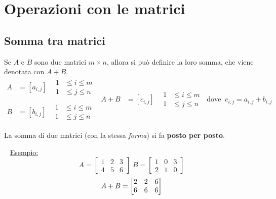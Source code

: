\documentclass[12pt,oneside]{book}
\begin{document}
\section{Operazioni con le matrici}
\subsection{Somma tra matrici}
Se $A$ e $B$ sono due matrici $m \times n$, allora si può definire la loro somma, che viene
denotata con $A+B$.
\begin{equation*}
    \begin{split}
        A & = [a_{i,j}] \;\;\; \begin{aligned} 1&\le i\le m\\ 1&\le j\le n \end{aligned} \\
        \\
        B & = [b_{i,j}] \;\;\; \begin{aligned} 1&\le i\le m\\ 1&\le j\le n \end{aligned}
    \end{split}
    \begin{split}
        A+B & = [c_{i,j}] \;\;\; \begin{aligned} 1&\le i\le m\\ 1&\le j\le n \end{aligned} \;\; \text{dove} \;\;
        c_{i,j} = a_{i,j} + b_{i,j}
    \end{split}
\end{equation*}

La somma di due matrici (con la stessa \emph{forma}) si fa \textbf{posto per posto}.

~\newline
\underline{Esempio:}
\begin{equation*}
    A=
    \begin{bmatrix}
        1 & 2 & 3 \\
        4 & 5 & 6
    \end{bmatrix} \;
    B=
    \begin{bmatrix}
        1 & 0 & 3 \\
        2 & 1 & 0
    \end{bmatrix}
\end{equation*}
\begin{equation*}
    \\ A+B=
    \begin{bmatrix}
        2 & 2 & 6 \\
        6 & 6 & 6
    \end{bmatrix}
\end{equation*}
\end{document}
